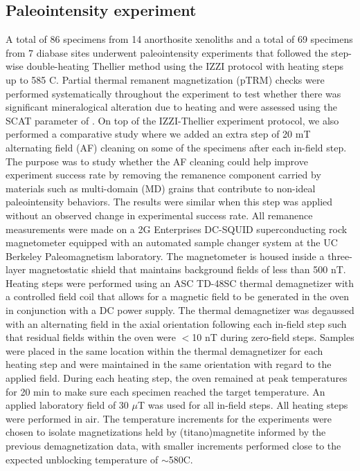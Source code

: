 \documentclass[9pt,twocolumn,twoside,lineno]{pnas-new}
\begin{document}
{\subsection*{Paleointensity experiment}
A total of 86 specimens from 14 anorthosite xenoliths and a total of 69 specimens from 7 diabase sites underwent paleointensity experiments that followed the step-wise double-heating Thellier method \cite{Thellier1959a} using the IZZI protocol \cite{Yu2004a} with heating steps up to 585 \textdegree C. Partial thermal remanent magnetization (pTRM) checks were performed systematically throughout the experiment to test whether there was significant mineralogical alteration due to heating and were assessed using the SCAT parameter of  \citealp{Shaar2013a}. On top of the IZZI-Thellier experiment protocol, we also performed a comparative study where we added an extra step of 20 mT alternating field (AF) cleaning on some of the specimens after each in-field step. The purpose was to study whether the AF cleaning could help improve experiment success rate by removing the remanence component carried by materials such as multi-domain (MD) grains that contribute to non-ideal paleointensity behaviors. The results were similar when this step was applied without an observed change in experimental success rate. All remanence measurements were made on a 2G Enterprises DC-SQUID superconducting rock magnetometer equipped with an automated sample changer system at the UC Berkeley Paleomagnetism laboratory. The magnetometer is housed inside a three-layer magnetostatic shield that maintains background fields of less than 500 nT. Heating steps were performed using an ASC TD-48SC thermal demagnetizer with a controlled field coil that allows for a magnetic field to be generated in the oven in conjunction with a DC power supply. The thermal demagnetizer was degaussed with an alternating field in the axial orientation following each in-field step such that residual fields within the oven were $<$10 nT during zero-field steps. Samples were placed in the same location within the thermal demagnetizer for each heating step and were maintained in the same orientation with regard to the applied field. During each heating step, the oven remained at peak temperatures for 20 min to make sure each specimen reached the target temperature. An applied laboratory field of 30 $\mu$T was used for all in-field steps. All heating steps were performed in air. The temperature increments for the experiments were chosen to isolate magnetizations held by (titano)magnetite informed by the previous demagnetization data, with smaller increments performed close to the expected unblocking temperature of $\sim$580\textdegree C. 

}
\end{document}
